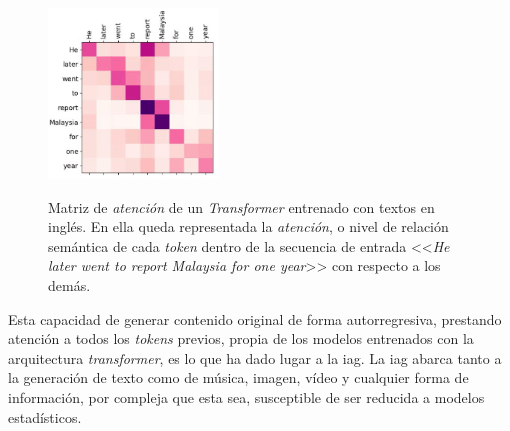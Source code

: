 \begin{figure}[H]
    \caption[Matriz de \emph{atención} de un \emph{Transformer} entrenado con textos en inglés]{Matriz de \emph{atención} de un \textit{Transformer} entrenado con textos en inglés. En ella queda representada la \emph{atención}, o nivel de relación semántica de cada \emph{token} dentro de la secuencia de entrada <<\emph{He later went to report Malaysia for one year}>> con respecto a los demás.}
    \centering
    \includegraphics[width=0.4\textwidth]{./figuras/Transformer_attention_matrix.png}
    \label{fig:transformer_attention}
\end{figure}

Esta capacidad de generar contenido original de forma autorregresiva, prestando atención a todos los \textit{tokens} previos, propia de los modelos entrenados con la arquitectura \textit{transformer}, es lo que ha dado lugar a la \gls{iag}. La \gls{iag} abarca tanto a la generación de texto como de música, imagen, vídeo y cualquier forma de información, por compleja que esta sea, susceptible de ser reducida a modelos estadísticos.